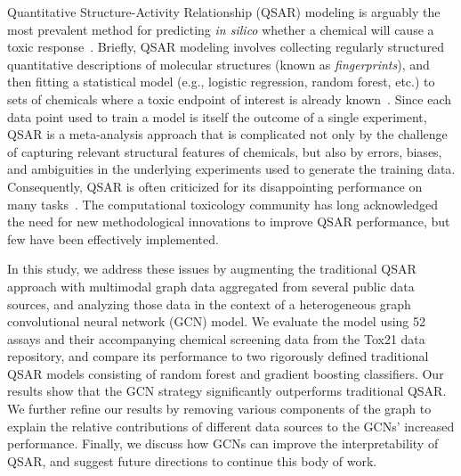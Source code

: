 \documentclass{ws-procs11x85}
\begin{document}
Quantitative Structure-Activity Relationship (QSAR) modeling is arguably the most prevalent method for predicting \textit{in silico} whether a chemical will cause a toxic response~\cite{dudek2006computational}.
Briefly, QSAR modeling involves collecting regularly structured quantitative descriptions of molecular structures (known as \textit{fingerprints}), and then fitting a statistical model (e.g., logistic regression, random forest, etc.) to sets of chemicals where a toxic endpoint of interest is already known~\cite{tropsha2010best,hansch1964p}.
Since each data point used to train a model is itself the outcome of a single experiment, QSAR is a meta-analysis approach that is complicated not only by the challenge of capturing relevant structural features of chemicals, but also by errors, biases, and ambiguities in the underlying experiments used to generate the training data.
Consequently, QSAR is often criticized for its disappointing performance on many tasks~\cite{cherkasov2014qsar,maggiora2006outliers}.
The computational toxicology community has long acknowledged the need for new methodological innovations to improve QSAR performance, but few have been effectively implemented.

In this study, we address these issues by augmenting the traditional QSAR approach with multimodal graph data aggregated from several public data sources, and analyzing those data in the context of a heterogeneous graph convolutional neural network (GCN) model.
We evaluate the model using 52 assays and their accompanying chemical screening data from the Tox21 data repository, and compare its performance to two rigorously defined traditional QSAR models consisting of random forest and gradient boosting classifiers.
Our results show that the GCN strategy significantly outperforms traditional QSAR.
We further refine our results by removing various components of the graph to explain the relative contributions of different data sources to the GCNs' increased performance.
Finally, we discuss how GCNs can improve the interpretability of QSAR, and suggest future directions to continue this body of work.
\end{document}
